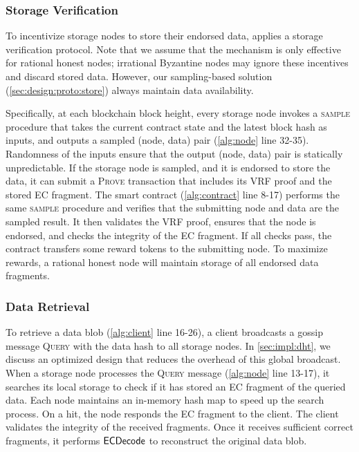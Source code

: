 \subsubsection{Storage Verification}
\label{sec:design:proto:pos}
To incentivize storage nodes to store their endorsed data, \sys applies a storage verification protocol.
Note that we assume that the mechanism is only effective for rational honest nodes;
irrational Byzantine nodes may ignore these incentives and discard stored data.
However, our sampling-based solution (\cref{sec:design:proto:store}) always maintain data availability.

Specifically, at each blockchain block height, every storage node invokes a \textsc{sample} procedure that takes the current contract state and the latest block hash as inputs, and outputs a sampled (node, data) pair (\cref{alg:node} line 32-35).
Randomness of the inputs ensure that the output (node, data) pair is statically unpredictable.
If the storage node is sampled, and it is endorsed to store the data, it can submit a \textsc{Prove} transaction that includes its VRF proof and the stored EC fragment.
The smart contract (\cref{alg:contract} line 8-17) performs the same \textsc{sample} procedure and verifies that the submitting node and data are the sampled result.
It then validates the VRF proof, ensures that the node is endorsed, and checks the integrity of the EC fragment.
If all checks pass, the contract transfers some reward tokens to the submitting node.
To maximize rewards, a rational honest node will maintain storage of all endorsed data fragments.

\subsubsection{Data Retrieval}
\label{sec:design:proto:retrieval}
To retrieve a data blob (\cref{alg:client} line 16-26), a client broadcasts a gossip message \textsc{Query} with the data hash to all storage nodes.
In \cref{sec:impl:dht}, we discuss an optimized design that reduces the overhead of this global broadcast.
When a storage node processes the \textsc{Query} message (\cref{alg:node} line 13-17), it searches its local storage to check if it has stored an EC fragment of the queried data.
Each node maintains an in-memory hash map to speed up the search process.
On a hit, the node responds the EC fragment to the client.
The client validates the integrity of the received fragments.
Once it receives sufficient correct fragments, it performs $\textsf{ECDecode}$ to reconstruct the original data blob.

